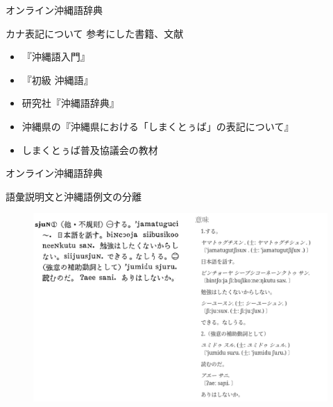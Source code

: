 \documentclass[14pt]{beamer}
\begin{document}
\begin{frame}{オンライン沖縄語辞典}
  \begin{block}{カナ表記について}
    \vspace{0pt}
    参考にした書籍、文献
    \begin{itemize}
    \item 『沖縄語入門』
    \item 『初級 沖縄語』
    \item 研究社『沖縄語辞典』
    \item 沖縄県の『沖縄県における「しまくとぅば」の表記について』
    \item しまくとぅば普及協議会の教材
    \end{itemize}
  \end{block}
\end{frame}


\begin{frame}{オンライン沖縄語辞典}
  \begin{block}{語彙説明文と沖縄語例文の分離}
    \begin{figure}[ht]
      \centering
      \begin{minipage}{\paperwidth}
        \includegraphics[height=0.6\paperheight,width=0.7\paperwidth]{okinawago-app-explanation-example.png}
      \end{minipage}
    \end{figure}
  \end{block}
\end{frame}
\end{document}
